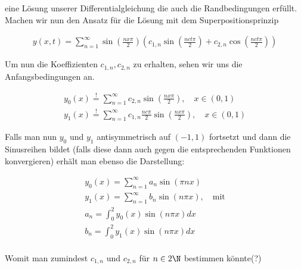 \begin{solution}
eine Lösung unserer Differentialgleichung die auch die Randbedingungen erfüllt.
Machen wir nun den Ansatz für die Lösung mit dem Superpositionsprinzip

\begin{align*}
  y(x,t)
  =
  \sum_{n=1}^{\infty} \sin(\frac{nx\pi}{2})
  (c_{1,n}\sin(\frac{nct\pi}{2})+c_{2,n}\cos(\frac{nct\pi}{2}))
\end{align*}

Um nun die Koeffizienten $c_{1,n},c_{2,n}$ zu erhalten, sehen wir uns die
Anfangsbedingungen an.

\begin{align*}
  y_0(x)
  \stackrel{!}{=}
  \sum_{n=1}^\infty c_{2,n}\sin(\frac{nx\pi}{2}),       \quad x \in (0,1) \\
  y_1(x)
  \stackrel{!}{=}
  \sum_{n=1}^\infty c_{1,n}\frac{nc\pi}{2}\sin(\frac{nx\pi}{2}),  \quad x \in (0,1)
\end{align*}

Falls man nun $y_0$ und $y_1$ antisymmetrisch auf $(-1,1)$
fortsetzt und dann die Sinusreihen bildet (falls diese dann auch gegen die entsprechenden Funktionen
konvergieren) erhält man ebenso die Darstellung:

\begin{align*}
  y_0(x)
  =
  \sum_{n=1}^\infty a_n \sin(\pi nx) \\
  y_1(x)
  =
  \sum_{n=1}^\infty b_n \sin(n \pi x), \quad \text{mit} \\
  a_n
  =
  \int_0^2 y_0(x)\sin(n\pi x) dx \\
  b_n
  =
  \int_0^2 y_1(x)\sin(n\pi x) dx \\
\end{align*}

Womit man zumindest $c_{1,n}$ und $c_{2,n}$ für $n \in 2\N$ bestimmen könnte(?)

\end{solution}
